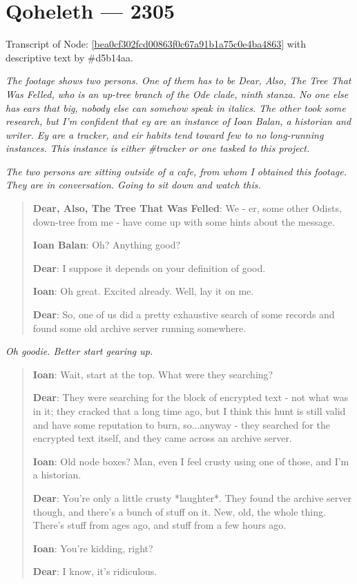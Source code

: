 \chapter*{Qoheleth — 2305}

Transcript of Node: \href{http://35.165.134.227/node/bea0cf302fcd00863f0c67a91b1a75c0e4ba4863}{{[}bea0cf302fcd00863f0c67a91b1a75c0e4ba4863{]}} with descriptive text by \#d5b14aa.

\secdiv{}

\noindent \emph{The footage shows two persons. One of them has to be Dear, Also, The Tree That Was Felled, who is an up-tree branch of the Ode clade, ninth stanza. No one else has ears that big, nobody else can somehow speak in italics. The other took some research, but I'm confident that ey are an instance of Ioan Balan, a historian and writer. Ey are a tracker, and eir habits tend toward few to no long-running instances. This instance is either \#tracker or one tasked to this project.}

\emph{The two persons are sitting outside of a cafe, from whom I obtained this footage. They are in conversation. Going to sit down and watch this.}

\begin{quote}
\textbf{Dear, Also, The Tree That Was Felled}: We - er, some other Odists, down-tree from me - have come up with some hints about the message.

\textbf{Ioan Balan}: Oh? Anything good?

\textbf{Dear}: I suppose it depends on your definition of good.

\textbf{Ioan}: Oh great. Excited already. Well, lay it on me.

\textbf{Dear}: So, one of us did a pretty exhaustive search of some records and found some old archive server running somewhere.
\end{quote}

\emph{Oh goodie. Better start gearing up.}

\begin{quote}
\textbf{Ioan}: Wait, start at the top. What were they searching?

\textbf{Dear}: They were searching for the block of encrypted text - not what was in it; they cracked that a long time ago, but I think this hunt is still valid and have some reputation to burn, so...anyway - they searched for the encrypted text itself, and they came across an archive server.

\textbf{Ioan}: Old node boxes? Man, even I feel crusty using one of those, and I'm a historian.

\textbf{Dear}: You're only a little crusty *laughter*. They found the archive server though, and there's a bunch of stuff on it. New, old, the whole thing. There's stuff from ages ago, and stuff from a few hours ago.

\textbf{Ioan}: You're kidding, right?

\textbf{Dear}: I know, it's ridiculous.
\end{quote}

